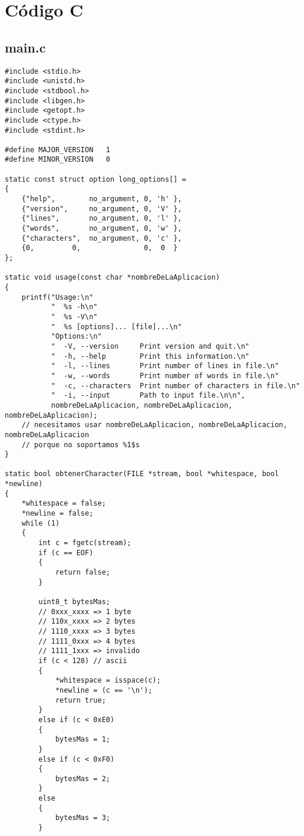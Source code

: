 \documentclass[a4paper]{article}
\begin{document}
\section{Código C}
\lstset{language=C}
\subsection{main.c}

\begin{lstlisting}[style=CStyle]
#include <stdio.h>
#include <unistd.h>
#include <stdbool.h>
#include <libgen.h>
#include <getopt.h>
#include <ctype.h>
#include <stdint.h>

#define MAJOR_VERSION   1
#define MINOR_VERSION   0

static const struct option long_options[] =
{
    {"help",        no_argument, 0, 'h' },
    {"version",     no_argument, 0, 'V' },
    {"lines",       no_argument, 0, 'l' },
    {"words",       no_argument, 0, 'w' },
    {"characters",  no_argument, 0, 'c' },
    {0,         0,               0,  0  }
};

static void usage(const char *nombreDeLaAplicacion)
{
    printf("Usage:\n"
           "  %s -h\n"
           "  %s -V\n"
           "  %s [options]... [file]...\n"
           "Options:\n"
           "  -V, --version     Print version and quit.\n"
           "  -h, --help        Print this information.\n"
           "  -l, --lines       Print number of lines in file.\n"
           "  -w, --words       Print number of words in file.\n"
           "  -c, --characters  Print number of characters in file.\n"
           "  -i, --input       Path to input file.\n\n",
           nombreDeLaAplicacion, nombreDeLaAplicacion, nombreDeLaAplicacion);
    // necesitamos usar nombreDeLaAplicacion, nombreDeLaAplicacion, nombreDeLaAplicacion
    // porque no soportamos %1$s
}

static bool obtenerCharacter(FILE *stream, bool *whitespace, bool *newline)
{
    *whitespace = false;
    *newline = false;
    while (1)
    {
        int c = fgetc(stream);
        if (c == EOF)
        {
            return false;
        }

        uint8_t bytesMas;
        // 0xxx_xxxx => 1 byte
        // 110x_xxxx => 2 bytes
        // 1110_xxxx => 3 bytes
        // 1111_0xxx => 4 bytes
        // 1111_1xxx => invalido
        if (c < 128) // ascii
        {
            *whitespace = isspace(c);
            *newline = (c == '\n');
            return true;
        }
        else if (c < 0xE0)
        {
            bytesMas = 1;
        }
        else if (c < 0xF0)
        {
            bytesMas = 2;
        }
        else
        {
            bytesMas = 3;
        }


\end{lstlisting}
\end{document}
